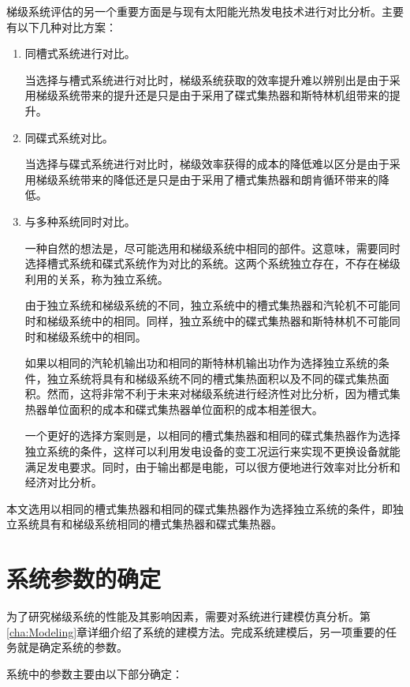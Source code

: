 梯级系统评估的另一个重要方面是与现有太阳能光热发电技术进行对比分析。主要有以下几种对比方案：

\begin{enumerate}[label=(\arabic*)]
	\item 同槽式系统进行对比。 

	当选择与槽式系统进行对比时，梯级系统获取的效率提升难以辨别出是由于采用梯级系统带来的提升还是只是由于采用了碟式集热器和斯特林机组带来的提升。
	\item 同碟式系统对比。
	
	当选择与碟式系统进行对比时，梯级效率获得的成本的降低难以区分是由于采用梯级系统带来的降低还是只是由于采用了槽式集热器和朗肯循环带来的降低。
	\item 与多种系统同时对比。
	
	一种自然的想法是，尽可能选用和梯级系统中相同的部件。这意味，需要同时选择槽式系统和碟式系统作为对比的系统。这两个系统独立存在，不存在梯级利用的关系，称为独立系统。
	
	由于独立系统和梯级系统的不同，独立系统中的槽式集热器和汽轮机不可能同时和梯级系统中的相同。同样，独立系统中的碟式集热器和斯特林机不可能同时和梯级系统中的相同。
	
	如果以相同的汽轮机输出功和相同的斯特林机输出功作为选择独立系统的条件，独立系统将具有和梯级系统不同的槽式集热面积以及不同的碟式集热面积。然而，这将非常不利于未来对梯级系统进行经济性对比分析，因为槽式集热器单位面积的成本和碟式集热器单位面积的成本相差很大。
	
	一个更好的选择方案则是，以相同的槽式集热器和相同的碟式集热器作为选择独立系统的条件，这样可以利用发电设备的变工况运行来实现不更换设备就能满足发电要求。同时，由于输出都是电能，可以很方便地进行效率对比分析和经济对比分析。
	
\end{enumerate}

本文选用以相同的槽式集热器和相同的碟式集热器作为选择独立系统的条件，即独立系统具有和梯级系统相同的槽式集热器和碟式集热器。

\section{系统参数的确定}

为了研究梯级系统的性能及其影响因素，需要对系统进行建模仿真分析。第\ref{cha:Modeling}章详细介绍了系统的建模方法。完成系统建模后，另一项重要的任务就是确定系统的参数。

系统中的参数主要由以下部分确定：

